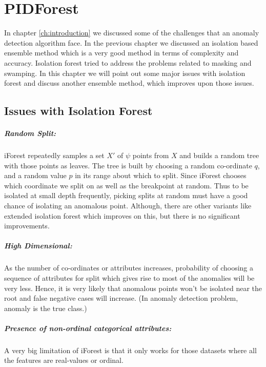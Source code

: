 \chapter{PIDForest}
\label{ch:pidforest}

In chapter \ref{ch:introduction} we discussed some of the challenges that an anomaly detection algorithm face. 
In the previous chapter we discussed an isolation based ensemble method which is a very good method in terms of complexity and accuracy. Isolation forest tried to address the problems related to masking and swamping.
In this chapter we will point out some major issues with isolation forest and 
discuss another ensemble method, which improves upon those issues.

\section{Issues with Isolation Forest}
\label{sec:issues-with-iforest}

\paragraph{Random Split:} iForest repeatedly samples a set $X'$ of $\psi$ points from $X$ and builds a random tree with those points as leaves. 
The tree is built by choosing a random co-ordinate $q$, and a random value $p$ in its range about which to split. 
Since iForest chooses which coordinate we split on as well as the breakpoint at random. 
Thus to be isolated at small depth frequently, picking splits at random must have a good chance of isolating an anomalous point.
Although, there are other variants like extended isolation forest which improves on this, but there is no significant improvements.

\paragraph{High Dimensional:} As the number of co-ordinates or attributes increases, probability of choosing a sequence of attributes for split which gives rise to most of the anomalies will be very less. 
Hence, it is very likely that anomalous points won't be isolated near the root and false negative cases will increase. (In anomaly detection problem, anomaly is the true class.)

\paragraph{Presence of non-ordinal categorical attributes:} A very big limitation of iForest is that it only works for those datasets where all the features are real-values or ordinal.

